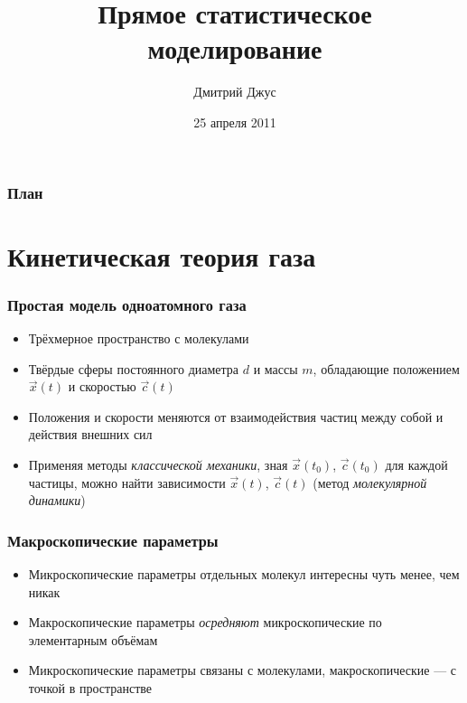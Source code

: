 \documentclass[onlymath]{beamer}
\title{Прямое статистическое моделирование}
\author{Дмитрий Джус}
\institute{АК-121}
\date{25 апреля 2011}
\begin{document}
\begin{frame}
  \titlepage
\end{frame}

\begin{frame}
  \frametitle{План}
  \tableofcontents
\end{frame}

\section{Кинетическая теория газа}

\begin{frame}
  \frametitle{Простая модель одноатомного газа}
  \begin{itemize}
  \item Трёхмерное пространство с молекулами
  \item Твёрдые сферы постоянного диаметра $d$ и массы $m$, обладающие
    положением $\vec{x}(t)$ и скоростью $\vec{c}(t)$
  \item Положения и скорости меняются от взаимодействия частиц между
    собой и действия внешних сил
  \item Применяя методы \emph{классической механики}, зная
    $\vec{x}(t_0)$, $\vec{c}(t_0)$ для каждой частицы, можно найти
    зависимости $\vec{x}(t)$, $\vec{c}(t)$ (метод \emph{молекулярной
      динамики})
  \end{itemize}
\end{frame}

\begin{frame}
  \frametitle{Макроскопические параметры}
  \begin{itemize}
  \item Микроскопические параметры отдельных молекул интересны чуть
    менее, чем никак
  \item Макроскопические параметры \emph{осредняют} микроскопические
    по элементарным объёмам
  \item Микроскопические параметры связаны с молекулами,
    макроскопические — с точкой в пространстве
  \end{itemize}
\end{frame}
\end{document}
